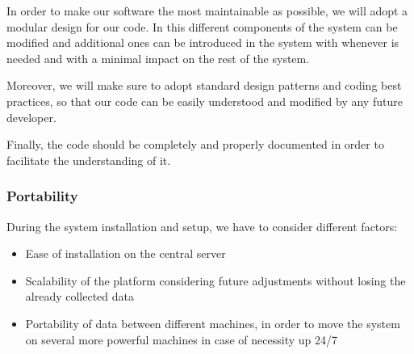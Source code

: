 In order to make our software the most maintainable as possible, we will adopt a modular design for our code. In this different components of the system can be modified and additional ones can be introduced in the system with whenever is needed and with a minimal impact on the rest of the system.

Moreover, we will make sure to adopt standard design patterns and coding best practices, so that our code can be easily understood and modified by any future developer.

Finally, the code should be completely and properly documented in order to facilitate the understanding of it. 

\subsubsection{Portability}

During the system installation and setup, we have to consider different factors:

\begin{itemize}
	\item Ease of installation on the central server
	\item Scalability of the platform considering future adjustments without losing the already collected data
	\item Portability of data between different machines, in order to move the system on several more powerful machines in case of necessity
	up 24/7
\end{itemize}
